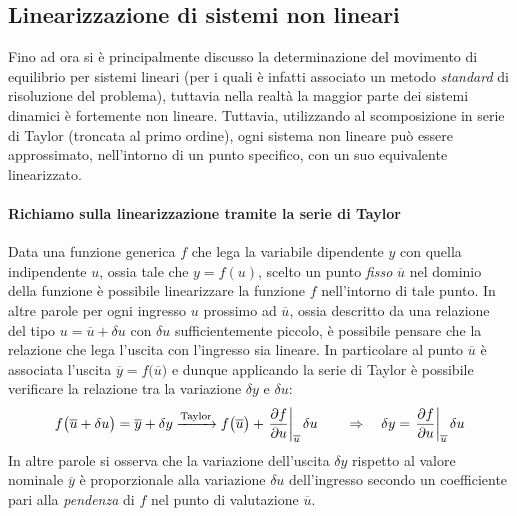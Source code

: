 	\subsection{Linearizzazione di sistemi non lineari} \label{sec:intro:linearizzazione}
		Fino ad ora si è principalmente discusso la determinazione del movimento di equilibrio per sistemi lineari (per i quali è infatti associato un metodo \textit{standard} di risoluzione del problema), tuttavia nella realtà la maggior parte dei sistemi dinamici è fortemente non lineare. Tuttavia, utilizzando al scomposizione in serie di Taylor (troncata al primo ordine), ogni sistema non lineare può essere approssimato, nell'intorno di un punto specifico, con un suo equivalente linearizzato.
		
		\paragraph{Richiamo sulla linearizzazione tramite la serie di Taylor} Data una funzione generica $f$ che lega la variabile dipendente $y$ con quella indipendente $u$, ossia tale che $y = f(u)$, scelto un punto \textit{fisso} $\overline u$ nel dominio della funzione è possibile linearizzare la funzione $f$ nell'intorno di tale punto. In altre parole per ogni ingresso $u$ prossimo ad $\overline u$, ossia descritto da una relazione del tipo $u = \overline u + \delta u$ con $\delta u$ sufficientemente piccolo, è possibile pensare che la relazione che lega l'uscita con l'ingresso sia lineare. In particolare al punto $\overline u$ è associata l'uscita $\overline y = f\big(\overline u\big)$ e dunque applicando la serie di Taylor è possibile verificare la relazione tra la variazione $\delta y$ e $\delta u$:
		\begin{equation}\label{eq:intro:taylor}
			f\big(\overline u + \delta u \big) = \overline y + \delta y \xrightarrow{\textrm{Taylor}} f\big(\overline u\big) + \left. \frac{\partial f}{\partial u} \right|_{\overline u} \delta u \qquad \Rightarrow \quad \delta y = \left. \frac{\partial f}{\partial u} \right|_{\overline u} \delta u 
		\end{equation}
		In altre parole si osserva che la variazione dell'uscita $\delta y$ rispetto al valore nominale $\overline y$ è proporzionale alla variazione $\delta u$ dell'ingresso secondo un coefficiente pari alla \textit{pendenza} di $f$ nel punto di valutazione $\overline u$.
		
